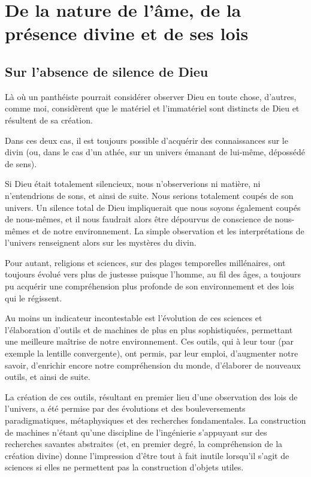 \part{De la nature de l'âme, de la présence divine et de ses lois}

\chapter{Sur l’absence de silence de Dieu}

Là où un panthéiste pourrait considérer observer Dieu en toute chose, d'autres, comme moi, considèrent que le matériel et l'immatériel sont distincts de Dieu et résultent de sa création.

Dans ces deux cas, il est toujours possible d'acquérir des connaissances sur le divin (ou, dans le cas d'un athée, sur un univers émanant de lui-même, dépossédé de sens).

Si Dieu était totalement silencieux, nous n'observerions ni matière, ni n'entendrions de sons, et ainsi de suite. Nous serions totalement coupés de son univers. Un silence total de Dieu impliquerait que nous soyons également coupés de nous-mêmes, et il nous faudrait alors être dépourvus de conscience de nous-mêmes et de notre environnement. La simple observation et les interprétations de l'univers renseignent alors sur les mystères du divin.

Pour autant, religions et sciences, sur des plages temporelles millénaires, ont toujours évolué vers plus de justesse puisque l'homme, au fil des âges, a toujours pu acquérir une compréhension plus profonde de son environnement et des lois qui le régissent.

Au moins un indicateur incontestable est l'évolution de ces sciences et l'élaboration d'outils et de machines de plus en plus sophistiquées, permettant une meilleure maîtrise de notre environnement. Ces outils, qui à leur tour (par exemple la lentille convergente), ont permis, par leur emploi, d'augmenter notre savoir, d'enrichir encore notre compréhension du monde, d'élaborer de nouveaux outils, et ainsi de suite.

La création de ces outils, résultant en premier lieu d'une observation des lois de l'univers, a été permise par des évolutions et des bouleversements paradigmatiques, métaphysiques et des recherches fondamentales. La construction de machines n'étant qu'une discipline de l'ingénierie s'appuyant sur des recherches savantes abstraites (et, en premier degré, la compréhension de la création divine) donne l'impression d'être tout à fait inutile lorsqu'il s'agit de sciences si elles ne permettent pas la construction d'objets utiles.

